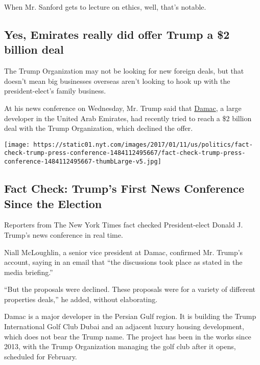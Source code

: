 When Mr. Sanford gets to lecture on ethics, well, that's notable.

\hypertarget{yes-emirates-really-did-offer-trump-a-2-billion-deal}{%
\subsection{Yes, Emirates really did offer Trump a \$2 billion
deal}\label{yes-emirates-really-did-offer-trump-a-2-billion-deal}}

The Trump Organization may not be looking for new foreign deals, but
that doesn't mean big businesses overseas aren't looking to hook up with
the president-elect's family business.

At his news conference on Wednesday, Mr. Trump said that
\href{https://www.damacproperties.com/en}{Damac}, a large developer in
the United Arab Emirates, had recently tried to reach a \$2 billion deal
with the Trump Organization, which declined the offer.

\href{https://www.nytimes.com/interactive/2017/01/11/us/politics/fact-check-trump-press-conference.html}{}

\texttt{[image: https://static01.nyt.com/images/2017/01/11/us/politics/fact-check-trump-press-conference-1484112495667/fact-check-trump-press-conference-1484112495667-thumbLarge-v5.jpg]}

\hypertarget{fact-check-trumps-first-news-conference-since-the-election}{%
\subsection{Fact Check: Trump's First News Conference Since the
Election}\label{fact-check-trumps-first-news-conference-since-the-election}}

Reporters from The New York Times fact checked President-elect Donald J.
Trump's news conference in real time.

Niall McLoughlin, a senior vice president at Damac, confirmed Mr.
Trump's account, saying in an email that ``the discussions took place as
stated in the media briefing.''

``But the proposals were declined. These proposals were for a variety of
different properties deals,'' he added, without elaborating.

Damac is a major developer in the Persian Gulf region. It is building
the Trump International Golf Club Dubai and an adjacent luxury housing
development, which does not bear the Trump name. The project has been in
the works since 2013, with the Trump Organization managing the golf club
after it opens, scheduled for February.

